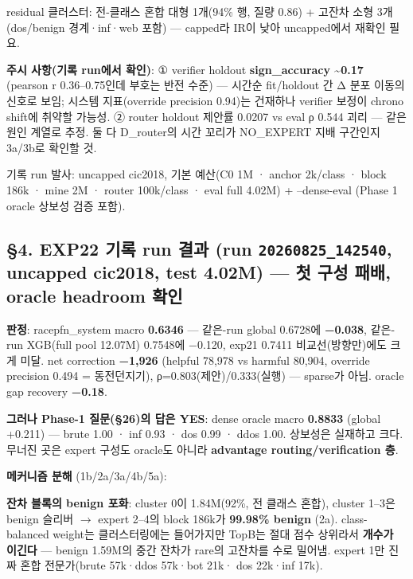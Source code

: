 \par\noindent \textbullet\enspace residual 클러스터: 전-클래스 혼합 대형 1개(94\% 행, 질량 0.86) +\allowbreak{} 고잔차 소형 3개(dos/\allowbreak{}benign 경계·inf·web 포함) — capped라 IR이 낮아 uncapped에서 재확인 필요.


\textbf{주시 사항(기록 run에서 확인)}: ① verifier holdout \textbf{sign\_\allowbreak{}accuracy \textasciitilde{}0.17} (pearson r 0.36–0.75인데 부호는 반전 수준) — 시간순 fit/\allowbreak{}holdout 간 Δ 분포 이동의 신호로 보임; 시스템 지표(override precision 0.94)는 건재하나 verifier 보정이 chrono shift에 취약할 가능성. ② router holdout 제안률 0.0207 vs eval ρ 0.544 괴리 — 같은 원인 계열로 추정. 둘 다 D\_\allowbreak{}router의 시간 꼬리가 NO\_\allowbreak{}EXPERT 지배 구간인지 3a/\allowbreak{}3b로 확인할 것.

기록 run 발사: uncapped cic2018, 기본 예산(C0 1M · anchor 2k/\allowbreak{}class · block 186k · mine 2M · router 100k/\allowbreak{}class · eval full 4.02M) +\allowbreak{} --dense-eval (Phase 1 oracle 상보성 검증 포함).

\subsection{§4. EXP22 기록 run 결과 (run \texttt{20260825\allowbreak{}\_\allowbreak{}\allowbreak{}142540}, uncapped cic2018, test 4.02M) — \textbf{첫 구성 패배, oracle headroom 확인}}
\textbf{판정}: racepfn\_\allowbreak{}system macro \textbf{0.6346} — 같은-run global 0.6728에 \textbf{−0.038}, 같은-run XGB(full pool 12.07M) 0.7548에 −0.120, exp21 0.7411 비교선(방향만)에도 크게 미달. net correction \textbf{−1,926} (helpful 78,978 vs harmful 80,904, override precision 0.494 =\allowbreak{} 동전던지기), ρ=\allowbreak{}0.803(제안)/\allowbreak{}0.333(실행) — sparse가 아님. oracle gap recovery \textbf{−0.18}.

\textbf{그러나 Phase-1 질문(§26)의 답은 YES}: dense oracle macro \textbf{0.8833} (global +\allowbreak{}0.211) — brute 1.00 · inf 0.93 · dos 0.99 · ddos 1.00. 상보성은 실재하고 크다. 무너진 곳은 expert 구성도 oracle도 아니라 \textbf{advantage routing/\allowbreak{}verification 층}.

\textbf{메커니즘 분해} (1b/\allowbreak{}2a/\allowbreak{}3a/\allowbreak{}4b/\allowbreak{}5a):

\par\noindent \textbullet\enspace \textbf{잔차 블록의 benign 포화}: cluster 0이 1.84M(92\%, 전 클래스 혼합), cluster 1–3은 benign 슬리버  \ensuremath{\rightarrow}  expert 2–4의 block 186k가 \textbf{99.98\% benign} (2a). class-balanced weight는 클러스터링에는 들어가지만 TopB는 절대 점수 상위라서 \textbf{개수가 이긴다} — benign 1.59M의 중간 잔차가 rare의 고잔차를 수로 밀어냄. expert 1만 진짜 혼합 전문가(brute 57k·ddos 57k·bot 21k· dos 22k·inf 17k).


